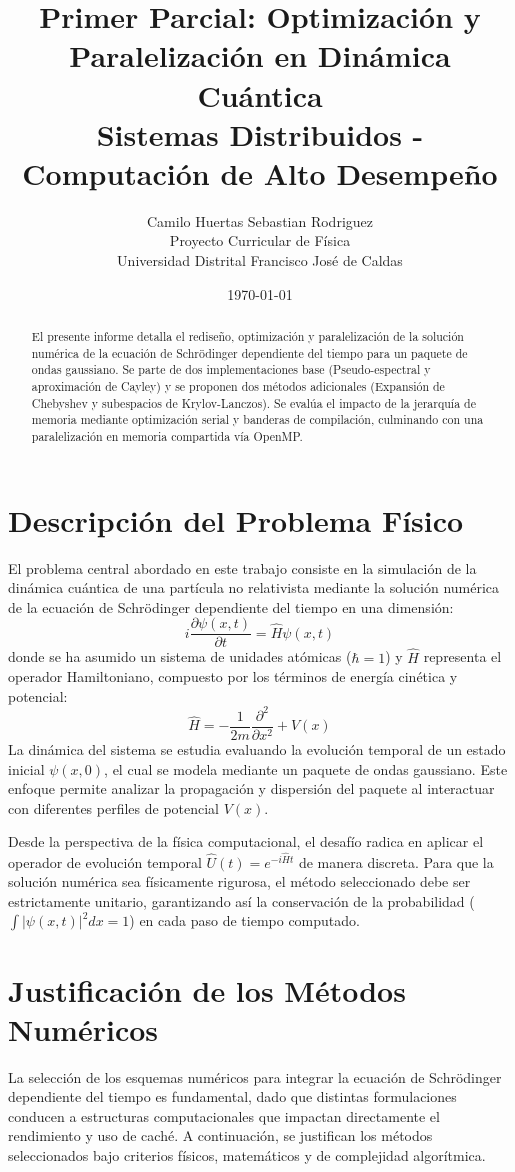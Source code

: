 \documentclass[12pt, a4paper]{article}
\title{\vspace{-2cm}\textbf{Primer Parcial: Optimización y Paralelización en Dinámica Cuántica}\\
\large Sistemas Distribuidos - Computación de Alto Desempeño}
\author{
    Camilo Huertas \quad Sebastian Rodriguez \\[0.3cm]
    \small Proyecto Curricular de Física \\
    \small Universidad Distrital Francisco José de Caldas
}
\date{\today}
\begin{document}
\maketitle

\begin{abstract}
El presente informe detalla el rediseño, optimización y paralelización de la solución numérica de la ecuación de Schrödinger dependiente del tiempo para un paquete de ondas gaussiano. Se parte de dos implementaciones base (Pseudo-espectral y aproximación de Cayley) y se proponen dos métodos adicionales (Expansión de Chebyshev y subespacios de Krylov-Lanczos). Se evalúa el impacto de la jerarquía de memoria mediante optimización serial y banderas de compilación, culminando con una paralelización en memoria compartida vía OpenMP.
\end{abstract}

\section{Descripción del Problema Físico}
El problema central abordado en este trabajo consiste en la simulación de la dinámica cuántica de una partícula no relativista mediante la solución numérica de la ecuación de Schrödinger dependiente del tiempo en una dimensión:
$$ i \frac{\partial \psi(x,t)}{\partial t} = \hat{H} \psi(x,t) $$
donde se ha asumido un sistema de unidades atómicas ($\hbar = 1$) y $\hat{H}$ representa el operador Hamiltoniano, compuesto por los términos de energía cinética y potencial:
$$ \hat{H} = -\frac{1}{2m}\frac{\partial^2}{\partial x^2} + V(x) $$
La dinámica del sistema se estudia evaluando la evolución temporal de un estado inicial $\psi(x,0)$, el cual se modela mediante un paquete de ondas gaussiano. Este enfoque permite analizar la propagación y dispersión del paquete al interactuar con diferentes perfiles de potencial $V(x)$. 

Desde la perspectiva de la física computacional, el desafío radica en aplicar el operador de evolución temporal $\hat{U}(t) = e^{-i\hat{H}t}$ de manera discreta. Para que la solución numérica sea físicamente rigurosa, el método seleccionado debe ser estrictamente unitario, garantizando así la conservación de la probabilidad ($\int |\psi(x,t)|^2 dx = 1$) en cada paso de tiempo computado.


\section{Justificación de los Métodos Numéricos}
La selección de los esquemas numéricos para integrar la ecuación de Schrödinger dependiente del tiempo es fundamental, dado que distintas formulaciones conducen a estructuras computacionales que impactan directamente el rendimiento y uso de caché. A continuación, se justifican los métodos seleccionados bajo criterios físicos, matemáticos y de complejidad algorítmica.
\end{document}
